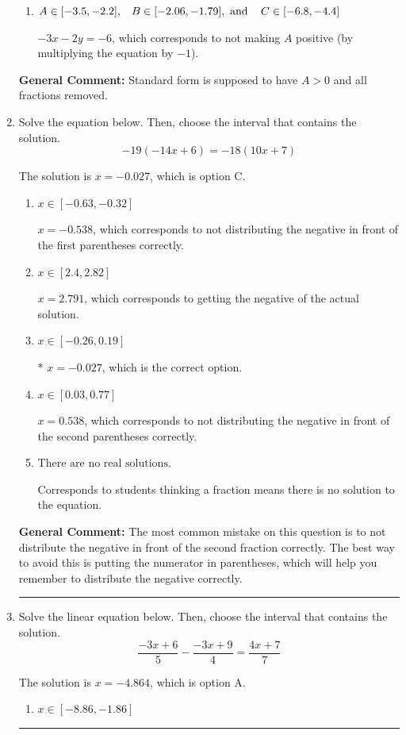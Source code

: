 \documentclass{extbook}[14pt]
\newcommand{\litem}[1]{\item #1

\rule{\textwidth}{0.4pt}}
\begin{document}
\begin{enumerate}
{\begin{enumerate}[label=\Alph*.]
 $1.5x + 1y = 3.0$, which corresponds to not removing rational values for Standard Form.
\item \( A \in [-3.5, -2.2], \hspace{3mm} B \in [-2.06, -1.79], \text{ and } \hspace{3mm} C \in [-6.8, -4.4] \)

 $-3x - 2y = -6$, which corresponds to not making $A$ positive (by multiplying the equation by $-1$).
\end{enumerate}

\textbf{General Comment:} Standard form is supposed to have $A > 0$ and all fractions removed.
}
\litem{
Solve the equation below. Then, choose the interval that contains the solution.
\[ -19(-14x + 6) = -18(10x + 7) \]

The solution is \( x = -0.027 \), which is option C.\begin{enumerate}[label=\Alph*.]
\item \( x \in [-0.63, -0.32] \)

$x = -0.538$, which corresponds to not distributing the negative in front of the first parentheses correctly.
\item \( x \in [2.4, 2.82] \)

$x = 2.791$, which corresponds to getting the negative of the actual solution.
\item \( x \in [-0.26, 0.19] \)

* $x = -0.027$, which is the correct option.
\item \( x \in [0.03, 0.77] \)

$x = 0.538$, which corresponds to not distributing the negative in front of the second parentheses correctly.
\item \( \text{There are no real solutions.} \)

Corresponds to students thinking a fraction means there is no solution to the equation.
\end{enumerate}

\textbf{General Comment:} The most common mistake on this question is to not distribute the negative in front of the second fraction correctly. The best way to avoid this is putting the numerator in parentheses, which will help you remember to distribute the negative correctly.
}
\litem{
Solve the linear equation below. Then, choose the interval that contains the solution.
\[ \frac{-3x + 6}{5} - \frac{-3x + 9}{4} = \frac{4x + 7}{7} \]

The solution is \( x = -4.864 \), which is option A.\begin{enumerate}[label=\Alph*.]
\item \( x \in [-8.86, -1.86] \)


\end{enumerate}}
\end{enumerate}
\end{document}
